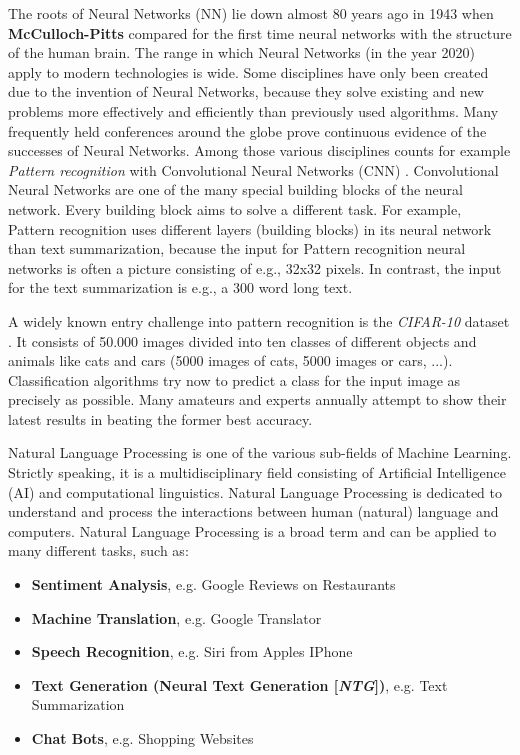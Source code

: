 The roots of Neural Networks (NN) lie down almost 80 years ago in 1943 when \textbf{McCulloch-Pitts} \cite{NN} compared for the first time neural networks with the structure of the human brain. The range in which Neural Networks (in the year 2020) apply to modern technologies is wide. Some disciplines have only been created due to the invention of Neural Networks, because they solve existing and new problems more effectively and efficiently than previously used algorithms. Many frequently held conferences around the globe prove continuous evidence of the successes of Neural Networks. Among those various disciplines counts for example \textit{Pattern recognition} with Convolutional Neural Networks (CNN) \cite{cnn}. Convolutional Neural Networks are one of the many special building blocks of the neural network. Every building block aims to solve a different task. For example, Pattern recognition uses different layers (building blocks) in its neural network than text summarization, because the input for Pattern recognition neural networks is often a picture consisting of e.g., 32x32 pixels. In contrast, the input for the text summarization is e.g., a 300 word long text.  

A widely known entry challenge into pattern recognition is the \textit{CIFAR-10} dataset \cite{cifar}. It consists of 50.000 images divided into ten classes of different objects and animals like cats and cars (5000 images of cats, 5000 images or cars, ...). Classification algorithms try now to predict a class for the input image as precisely as possible. Many amateurs \cite{tim} and experts annually attempt to show their latest results in beating the former best accuracy. 

Natural Language Processing is one of the various sub-fields of Machine Learning. Strictly speaking, it is a multidisciplinary field consisting of Artificial Intelligence (AI) and computational linguistics. Natural Language Processing is dedicated to understand and process the interactions between human (natural) language and computers. Natural Language Processing is a broad term and can be applied to many different tasks, such as: 
 

\begin{itemize}
\item \textbf{Sentiment Analysis}, e.g. Google Reviews on Restaurants
\item \textbf{Machine Translation}, e.g. Google Translator
\item \textbf{Speech Recognition}, e.g. Siri from Apples IPhone
\item \textbf{Text Generation (Neural Text Generation [\textit{NTG}])}, e.g. Text Summarization
\item \textbf{Chat Bots}, e.g. Shopping Websites
\end{itemize}

